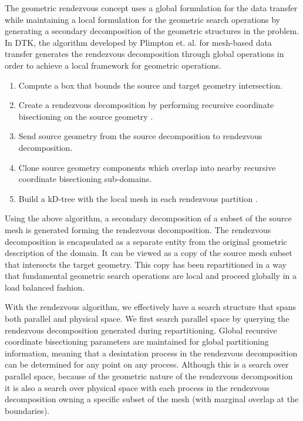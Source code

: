 \documentclass{mc2013}
\begin{document}
\label{subsec:rendezvous_algorithm}

The geometric rendezvous concept uses a global formulation for the
data transfer while maintaining a local formulation for the geometric
search operations by generating a secondary decomposition of the
geometric structures in the problem. In DTK, the algorithm developed by
Plimpton et. al. \cite{Plimpton_2004} for mesh-based data transfer
generates the rendezvous decomposition through global operations in
order to achieve a local framework for geometric operations.
\begin{enumerate}
\item Compute a box that bounds the source and target geometry
  intersection.
\item Create a rendezvous decomposition by performing recursive
  coordinate bisectioning on the source geometry \cite{Berger_1987}.
\item Send source geometry from the source decomposition to rendezvous
  decomposition.
\item Clone source geometry components which overlap into nearby
  recursive coordinate bisectioning sub-domains.
\item Build a kD-tree with the local mesh in each rendezvous
  partition \cite{Bentley_1975}.
\end{enumerate}
Using the above algorithm, a secondary decomposition of a subset of
the source mesh is generated forming the rendezvous decomposition. The
rendezvous decomposition is encapsulated as a separate entity from the
original geometric description of the domain. It can be viewed as a
copy of the source mesh subset that intersects the target
geometry. This copy has been repartitioned in a way that fundamental
geometric search operations are local and proceed globally in a load
balanced fashion.

With the rendezvous algorithm, we effectively have a search structure
that spans both parallel and physical space. We first search parallel
space by querying the rendezvous decomposition generated during
repartitioning. Global recursive coordinate bisectioning parameters
are maintained for global partitioning information, meaning that a
desintation process in the rendezvous decomposition can be determined
for any point on any process. Although this is a search over parallel
space, because of the geometric nature of the rendezvous decomposition
it is also a search over physical space with each process in the
rendezvous decomposition owning a specific subset of the mesh (with
marginal overlap at the boundaries).
 
\end{document}
